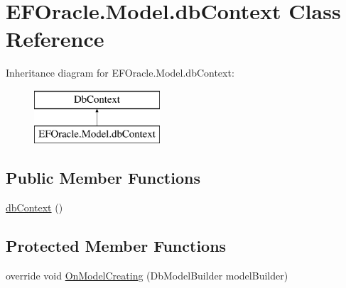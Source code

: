 \hypertarget{class_e_f_oracle_1_1_model_1_1db_context}{}\section{E\+F\+Oracle.\+Model.\+db\+Context Class Reference}
\label{class_e_f_oracle_1_1_model_1_1db_context}
Inheritance diagram for E\+F\+Oracle.\+Model.\+db\+Context\+:\begin{figure}[H]
\begin{center}
\leavevmode
\includegraphics[height=2.000000cm]{class_e_f_oracle_1_1_model_1_1db_context}
\end{center}
\end{figure}
\subsection*{Public Member Functions}
\begin{DoxyCompactItemize}
\item 
\hyperlink{class_e_f_oracle_1_1_model_1_1db_context_a5583d9c5a470911b15527260b9974eb3}{db\+Context} ()
\end{DoxyCompactItemize}
\subsection*{Protected Member Functions}
\begin{DoxyCompactItemize}
\item 
override void \hyperlink{class_e_f_oracle_1_1_model_1_1db_context_ad16f374ba040f57b97167ea2decb2c85}{On\+Model\+Creating} (Db\+Model\+Builder model\+Builder)
\end{DoxyCompactItemize}
